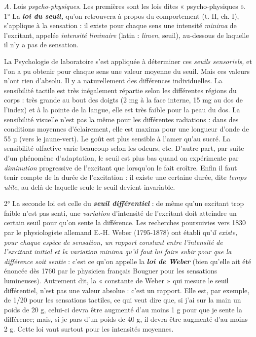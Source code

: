 {\it A.} Lois {\it psycho-physiques}. Les premières sont les lois dites « psycho-physiques ».
1° La \textbf{\textit {loi du seuil,}} qu’on retrouvera à propos du comportement
(t. II, ch. I), s’applique à la sensation : il existe pour chaque
sens une intensité {\it minima} de l’excitant, appelée {\it intensité liminaire}
(latin : {\it limen}, seuil), au-dessous de laquelle il n’y a pas de sensation.

\vspace{0.24cm}
{\footnotesize 
La Psychologie de laboratoire s’est appliquée à déterminer ces \textsf{\textit {seuils
sensoriels,}} et l’on a pu obtenir pour chaque sens une valeur moyenne du
seuil. Mais ces valeurs n’ont rien d’absolu. Il y a naturellement des
différences individuelles. La sensibilité tactile est très inégalement répartie
selon les différentes régions du corps : très grande au bout des doigts
(2 mg à la face interne, 15 mg au dos de l'index) et à la pointe de la
langue, elle est très faible pour la peau du dos. La sensibilité visuelle n’est
pas la même pour les différentes radiations : dans des conditions moyennes
d’éclairement, elle est maxima pour une longueur d'onde de 55 µ (vers le
jaune-vert). Le goût est plus sensible à l'amer qu’au sucré. La sensibilité
olfactive varie beaucoup selon les odeurs, etc. D'autre part, par suite d'un
phénomène d'adaptation, le seuil est plus bas quand on expérimente par
{\it diminution} progressive de l’excitant que lorsqu'on le fait croître. Enfin il
faut tenir compte de la durée de l’excitation : il existe une certaine durée,
dite {\it temps utile}, au delà de laquelle seule le seuil devient invariable.}
\vspace{0.31cm}

2° La seconde loi est celle du \textbf{\textit {seuil différentiel}} : de même qu’un
excitant trop faible n’est pas senti, une {\it variation} d’intensité de l’excitant
doit atteindre un certain seuil pour qu’on sente la différence.
Les recherches poursuivies vers 1830 par le physiologiste allemand
E.-H. Weber (1795-1878) ont établi qu’{\it il existe, pour chaque espèce
de sensation, un rapport constant entre l'intensité de l’excitant initial
et la variation minima qu’il faut lui faire subir pour que la différence
soit sentie} : c’est ce qu’on appelle la \textbf{\textit {loi de Weber}} (bien qu'elle ait
été énoncée dès 1760 par le physicien français Bouguer pour les
sensations lumineuses). Autrement dit, la « constante de Weber »
qui mesure le seuil différentiel, n’est pas une valeur absolue : c’est un
rapport. Elle est, par exemple, de 1/20 pour les sensations tactiles, ce
qui veut dire que, si j’ai sur la main un poids de 20 g, celui-ci devra
être augmenté d’au moins 1 g pour que je sente la différence; mais,
si je pars d’un poids de 40 g, il devra être augmenté d’au moins
2 g. Cette loi vaut surtout pour les intensités moyennes.

